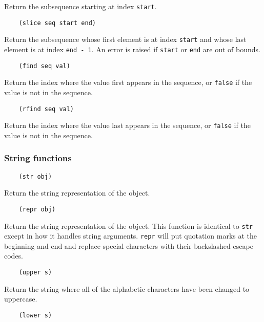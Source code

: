 \documentclass{article}
\newcommand{\inlinecode}{\texttt}
\begin{document}
Return the subsequence starting at index \inlinecode{start}.

\begin{verbatim}
    (slice seq start end)
\end{verbatim}

Return the subsequence whose first element is at index \inlinecode{start} and whose last element is at index \inlinecode{end - 1}. An error is raised if \inlinecode{start} or \inlinecode{end} are out of bounds.

\begin{verbatim}
    (find seq val)
\end{verbatim}

Return the index where the value first appears in the sequence, or \inlinecode{false} if the value is not in the sequence.

\begin{verbatim}
    (rfind seq val)
\end{verbatim}

Return the index where the value last appears in the sequence, or \inlinecode{false} if the value is not in the sequence.

\subsubsection{String functions}
\begin{verbatim}
    (str obj)
\end{verbatim}

Return the string representation of the object.

\begin{verbatim}
    (repr obj)
\end{verbatim}

Return the string representation of the object. This function is identical to \inlinecode{str} except in how it handles string arguments. \inlinecode{repr} will put quotation marks at the beginning and end and replace special characters with their backslashed escape codes.

\begin{verbatim}
    (upper s)
\end{verbatim}

Return the string where all of the alphabetic characters have been changed to uppercase.

\begin{verbatim}
    (lower s)
\end{verbatim}
\end{document}
